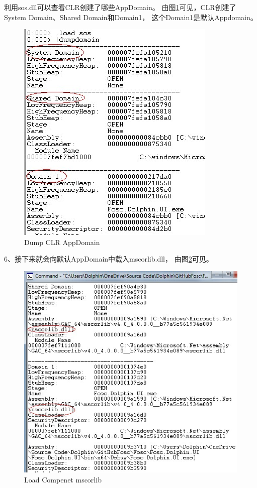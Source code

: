 \documentclass{book}
\begin{document}
利用sos.dll可以查看CLR创建了哪些AppDomain。
由图\ref{fig:CLRAppdomainDump}可见，CLR创建了System Domain、Shared Domain和Domain1，
这个Domain1是默认Appdomain。

\begin{figure}[htbp]
	\centering
	\includegraphics[scale=0.6]{CLRAppdomainDump.jpg}
	\caption{Dump CLR AppDomain}
	\label{fig:CLRAppdomainDump}
\end{figure}

6、接下来就会向默认AppDomain中载入mscorlib.dll，
由图\ref{fig:CLRMscoreLoad}可见。

\begin{figure}[htbp]
	\centering
	\includegraphics[scale=0.6]{CLRMscoreLoad.jpg}
	\caption{Load Compenet mscorlib}
	\label{fig:CLRMscoreLoad}
\end{figure}
\end{document}
